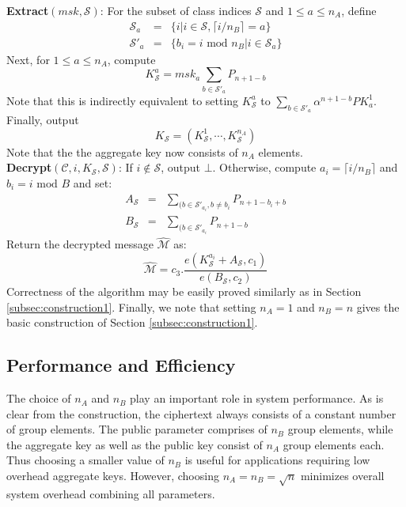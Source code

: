 \noindent \textbf{Extract}$(msk,\mathcal{S})$: For the subset of class indices $\mathcal{S}$ and $1\leq a \leq n_A$, define
\begin{eqnarray}
 \mathcal{S}_{a}&=&\{i|i\in\mathcal{S},\lceil i/n_B\rceil=a\} \nonumber\\
 \mathcal{S}'_a&=&\{b_i=i\text{ mod }n_B|i\in\mathcal{S}_{a}\}\nonumber
\end{eqnarray}
\noindent Next, for $1\leq a \leq n_A$, compute
\begin{equation}
 K^{a}_{\mathcal{S}} = {msk_{a}}\sum_{b\in\mathcal{S}'_a}P_{n+1-b} \nonumber
\end{equation}
\noindent Note that this is indirectly equivalent to setting $K^{a}_{\mathcal{S}}$ to $\sum_{b\in\mathcal{S}'_a}\alpha^{n+1-b}PK^{1}_a$. Finally, output 
\begin{equation}
 K_{\mathcal{S}} = (K^{1}_{\mathcal{S}},\cdots,K^{n_A}_{\mathcal{S}})\nonumber
\end{equation}
\noindent Note that the the aggregate key now consists of $n_A$ elements.\\

\noindent \textbf{Decrypt}$(\mathcal{C},i,K_{\mathcal{S}},\mathcal{S})$: If $i\notin\mathcal{S}$, output $\bot$. Otherwise, compute $a_i=\lceil i/n_B\rceil$ and $b_i=i \text{ mod } B$ and set: 
 \begin{eqnarray} 
 A_{\mathcal{S}}&=&\sum_{(b\in\mathcal{S}'_{a_i},b\neq b_i}P_{n+1-b_i+b} \nonumber \\
 B_{\mathcal{S}}&=&\sum_{(b\in\mathcal{S}'_{a_i}}P_{n+1-b} \nonumber  
 \end{eqnarray} 
 \noindent Return the decrypted message $\hat{\mathcal{M}}$ as:
 \begin{equation}
  \hat{\mathcal{M}}=c_3.\frac{{e}(K^{a_i}_{\mathcal{S}}+A_{\mathcal{S}},c_1)}{{e}(B_{\mathcal{S}},c_2)}\nonumber
 \end{equation} 
\noindent Correctness of the algorithm may be easily proved similarly as in Section \ref{subsec:construction1}. Finally, we note that setting $n_A=1$ and $n_B=n$ gives the basic construction of Section \ref{subsec:construction1}. 


\subsection{Performance and Efficiency}
\label{subsec:perf_twotier}

The choice of $n_A$ and $n_B$ play an important role in system performance. As is clear from the construction, the ciphertext always consists of a constant number of group elements. The public parameter comprises of $n_B$ group elements, while the aggregate key as well as the public key consist of $n_A$ group elements each. Thus choosing a smaller value of $n_B$ is useful for applications requiring low overhead aggregate keys. However, choosing $n_A=n_B=\sqrt{n}$ minimizes overall system overhead combining all parameters.

